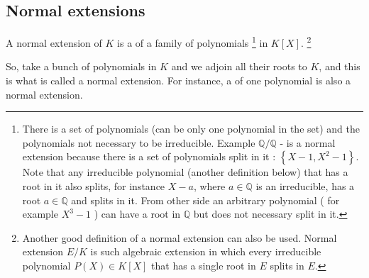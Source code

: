 \subsection{Normal extensions}

\begin{definition}
  A normal extension of $K$ is a  of a
  family of polynomials
  \footnote {
    There is a set of polynomials (can be only one polynomial in the
    set) and the polynomials not necessary to be irreducible. Example
    $\mathbb{Q}/\mathbb{Q}$ - is a normal 
    extension because there is a set of polynomials split in it :
    $\left\{X-1, X^2-1\right\}$. Note that any irreducible polynomial
    (another definition below) that has a root in it also splits, for
    instance $X - a$, where $a \in \mathbb{Q}$ is an irreducible, has
    a root $a \in \mathbb{Q}$ and splits in it. From other side an
    arbitrary polynomial ( for example $X^3-1$ ) can have a root in
    $\mathbb{Q}$ but does not necessary split in it. 
  }
  in $K\left[X\right]$.
  \footnote{
    Another good definition of a normal extension
    \cite{wiki:normalextrus} can also be used. Normal extension $E/K$ is
    such algebraic extension in which every irreducible polynomial
    $P(X) \in K\left[X\right]$ that has a single root in $E$ splits in
    $E$.   
  }
  \label{def:normalextension}
\end{definition}

\begin{remark}
  So, take a bunch of polynomials in $K$ and we adjoin all their roots
  to $K$, and this is what is called a normal extension.
  For instance, a  of one polynomial is
  also a normal extension. 
\end{remark}

